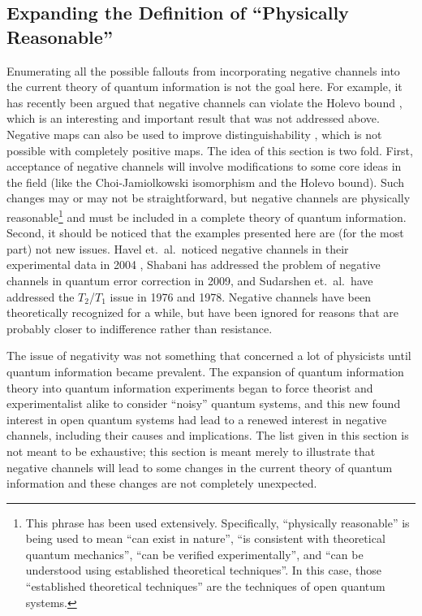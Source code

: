 \subsection{Expanding the Definition of ``Physically Reasonable''}

Enumerating all the possible fallouts from incorporating negative channels into the current theory of quantum information is not the goal here.  For example, it has recently been argued that negative channels can violate the Holevo bound \cite{Masillo2011}, which is an interesting and important result that was not addressed above.  Negative maps can also be used to improve distinguishability \cite{Carteret2008}, which is not possible with completely positive maps.  The idea of this section is two fold.  First, acceptance of negative channels will involve modifications to some core ideas in the field (like the Choi-Jamiolkowski isomorphism and the Holevo bound).  Such changes may or may not be straightforward, but negative channels are physically reasonable\footnote{This phrase has been used extensively.  Specifically, ``physically reasonable'' is being used to mean ``can exist in nature'', ``is consistent with theoretical quantum mechanics'', ``can be verified experimentally'', and ``can be understood using established theoretical techniques''.  In this case, those ``established theoretical techniques'' are the techniques of open quantum systems.} and must be included in a complete theory of quantum information.  Second, it should be noticed that the examples presented here are (for the most part) not new issues.  Havel et.\ al.\ noticed negative channels in their experimental data in 2004 \cite{Havel2003}, Shabani has addressed the problem of negative channels in quantum error correction in 2009, and Sudarshen et.\ al.\ have addressed the $T_2$/$T_1$ issue in 1976 and 1978.  Negative channels have been theoretically recognized for a while, but have been ignored for reasons that are probably closer to indifference rather than resistance.  

The issue of negativity was not something that concerned a lot of physicists until quantum information became prevalent.  The expansion of quantum information theory into quantum information experiments began to force theorist and experimentalist alike to consider ``noisy'' quantum systems, and this new found interest in open quantum systems had lead to a renewed interest in negative channels, including their causes and implications.  The list given in this section is not meant to be exhaustive; this section is meant merely to illustrate that negative channels will lead to some changes in the current theory of quantum information and these changes are not completely unexpected.

